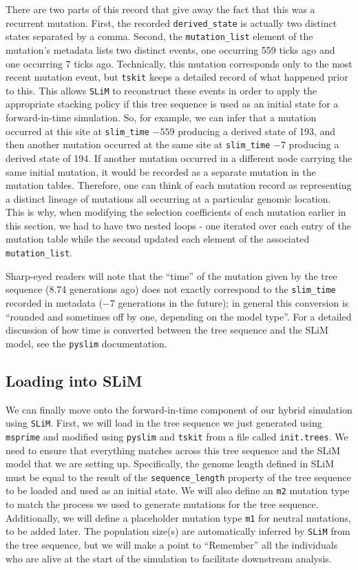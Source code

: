 \documentclass[12pt]{article}
\newcommand{\msprime}[0]{\texttt{msprime}\xspace}
\newcommand{\tskit}[0]{\texttt{tskit}\xspace}
\newcommand{\slim}[0]{\texttt{SLiM}\xspace}
\newcommand{\pyslim}[0]{\texttt{pyslim}\xspace}
\begin{document}
There are two parts of this record that give away the fact that this was a recurrent mutation. First, the recorded \verb|derived_state| is
actually two distinct states separated by a comma. Second, the \verb|mutation_list| element of the mutation's metadata lists two distinct
events, one occurring 559 ticks ago and one occurring 7 ticks ago. Technically, this mutation corresponds only to the most recent
mutation event, but \tskit keeps a detailed record of what happened prior to this. This allows \slim to reconstruct these events in order
to apply the appropriate stacking policy if this tree sequence is used as an initial state for a forward-in-time simulation. So, for example,
we can infer that a mutation occurred at this site at \verb|slim_time| $-559$ producing a derived state of 193, and then another mutation
occurred at the same site at \verb|slim_time| $-7$ producing a derived state of 194. If another mutation occurred in a different node carrying
the same initial mutation, it would be recorded as a separate mutation in the mutation tables. Therefore, one can think of each mutation
record as representing a distinct lineage of mutations all occurring at a particular genomic location. This is why, when modifying
the selection coefficients of each mutation earlier in this section, we had to have two nested loops - one iterated over each entry of the
mutation table while the second updated each element of the associated \verb|mutation_list|.

Sharp-eyed readers will note that the ``time'' of the mutation given by the tree sequence (8.74 generations ago) does not exactly
correspond to the \verb|slim_time| recorded in metadata ($-7$ generations in the future); in general this conversion is ``rounded and sometimes
off by one, depending on the model type''. For a detailed discussion of how time is converted between the tree sequence and the SLiM
model, see the \pyslim documentation.

\subsection*{Loading into SLiM}

We can finally move onto the forward-in-time component of our hybrid simulation using \slim. First, we will load in the tree sequence we just
generated using \msprime and modified using \pyslim and \tskit from a file called \verb|init.trees|. We need to ensure that everything matches
across this tree sequence and the SLiM model that we are setting up. Specifically, the genome length defined in SLiM must be equal to the
result of the \verb|sequence_length| property of the tree sequence to be loaded and used as an initial state. We will also define an \verb|m2|
mutation type to match the process we used to generate mutations for the tree sequence. Additionally, we will define a placeholder mutation
type \verb|m1| for neutral mutations, to be added later. The population size(s) are automatically inferred by \slim from the tree sequence,
but we will make a point to ``Remember'' all the individuals who are alive at the start of the simulation to facilitate downstream analysis.
\end{document}

